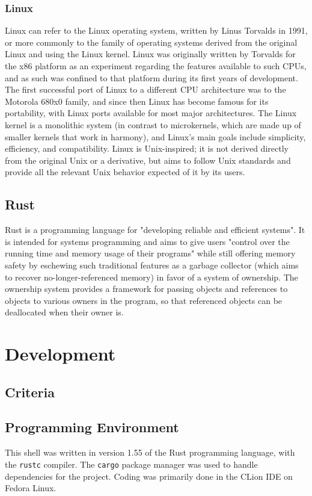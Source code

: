 \documentclass[12pt,twoside]{report} %
\begin{document}
	\subsection{Linux} \label{sec:linux}
	Linux can refer to the Linux operating system, written by Linus Torvalds in 1991, or more commonly to the family of operating systems derived from the original Linux and using the Linux kernel. Linux was originally written by Torvalds for the x86 platform as an experiment regarding the features available to such CPUs, and as such was confined to that platform during its first years of development. The first successful port of Linux to a different CPU architecture was to the Motorola 680x0 family, and since then Linux has become famous for its portability, with Linux ports available for most major architectures. The Linux kernel is a monolithic system (in contrast to microkernels, which are made up of smaller kernels that work in harmony), and Linux's main goals include simplicity, efficiency, and compatibility.\cite{linux} Linux is Unix-inspired; it is not derived directly from the original Unix or a derivative, but aims to follow Unix standards and provide all the relevant Unix behavior expected of it by its users.

	\section{Rust} \label{sec:rust}
	Rust is a programming language for "developing reliable and efficient systems". It is intended for systems programming and aims to give users "control over the running time and memory usage of their programs" while still offering memory safety by eschewing such traditional features as a garbage collector (which aims to recover no-longer-referenced memory) in favor of a system of ownership. The ownership system provides a framework for passing objects and references to objects to various owners in the program, so that referenced objects can be deallocated when their owner is.\cite{rust}

	\chapter{Development} \label{development}
	
	\section{Criteria} \label{sec:criteria}
	
	\section{Programming Environment} \label{sec:programming-environment}
	This shell was written in version 1.55 of the Rust programming language, with the \verb|rustc| compiler. The \verb|cargo| package manager was used to handle dependencies for the project. Coding was primarily done in the CLion IDE on Fedora Linux.
	
\end{document}
